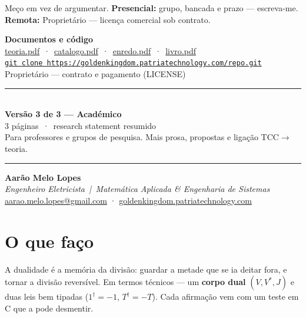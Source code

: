 \documentclass[11pt,a4paper]{article}
\newcommand{\divisa}[3]{%
  \noindent\rule{\textwidth}{1.2pt}\\[6pt]
  {\large\bfseries #1}\\[2pt]
  {\color{cinza}\small #2}\\[4pt]
  {\small #3}\\[6pt]
  \noindent\rule{\textwidth}{0.4pt}\par
  \vspace{8pt}%
}
\begin{document}
Meço em vez de argumentar. \textbf{Presencial:} grupo, bancada e prazo --- escreva-me.
\textbf{Remota:} Proprietário — licença comercial sob contrato.

\medskip
\begin{center}\small
\textbf{Documentos e código}\\[3pt]
\href{https://goldenkingdom.patriatechnology.com/docs/teoria.pdf}{teoria.pdf}
\,·\,
\href{https://goldenkingdom.patriatechnology.com/docs/catalogo.pdf}{catalogo.pdf}
\,·\,
\href{https://goldenkingdom.patriatechnology.com/docs/enredo.pdf}{enredo.pdf}
\,·\,
\href{https://goldenkingdom.patriatechnology.com/docs/livro.pdf}{livro.pdf}
\\[2pt]
\href{https://goldenkingdom.patriatechnology.com/repo.git}{\texttt{git clone https://goldenkingdom.patriatechnology.com/repo.git}}
\\[3pt]
{\footnotesize\color{cinza}Proprietário — contrato e pagamento (LICENSE)}
\end{center}

\newpage
\titlespacing{\section}{0pt}{12pt}{5pt}

\divisa{Versão 3 de 3 --- Académico}
{3 páginas \,·\, research statement resumido}
{Para professores e grupos de pesquisa. Mais prosa, propostas e ligação TCC$\to$teoria.}


\begin{center}
{\LARGE\bfseries Aarão Melo Lopes}\\[2pt]
{\color{cinza}\emph{Engenheiro Eletricista \,|\, Matemática Aplicada \& Engenharia de Sistemas}}\\[2pt]
{\small
\href{mailto:aarao.melo.lopes@gmail.com}{aarao.melo.lopes@gmail.com}
\quad·\quad
\href{https://goldenkingdom.patriatechnology.com}{goldenkingdom.patriatechnology.com}}
\end{center}

\vspace{-2pt}
\section*{O que faço}

A dualidade é a memória da divisão: guardar a metade que se ia deitar fora, e tornar a
divisão reversível. Em termos técnicos --- um \textbf{corpo dual} $(V,V^{*},J)$ e duas leis
bem tipadas ($1^{\dagger}=-1$, $T^{\dagger}=-T$). Cada afirmação vem com um teste em C que a
pode desmentir.
\end{document}
